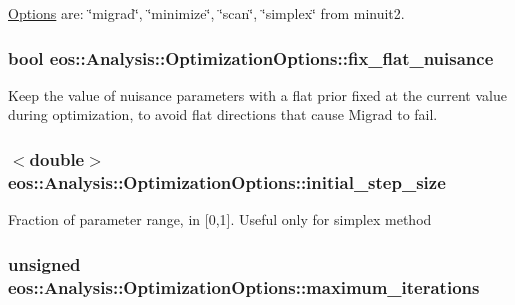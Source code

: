 \hyperlink{classeos_1_1Options}{Options} are: \char`\"{}migrad\char`\"{}, \char`\"{}minimize\char`\"{}, \char`\"{}scan\char`\"{}, \char`\"{}simplex\char`\"{} from minuit2. \hypertarget{structeos_1_1Analysis_1_1OptimizationOptions_abd24b29c8e1953f68dde207d8c5c48df}{
\subsubsection[{fix\_\-flat\_\-nuisance}]{\setlength{\rightskip}{0pt plus 5cm}bool {\bf eos::Analysis::OptimizationOptions::fix\_\-flat\_\-nuisance}}}
\label{structeos_1_1Analysis_1_1OptimizationOptions_abd24b29c8e1953f68dde207d8c5c48df}
Keep the value of nuisance parameters with a flat prior fixed at the current value during optimization, to avoid flat directions that cause Migrad to fail. \hypertarget{structeos_1_1Analysis_1_1OptimizationOptions_a8626041b40a908e5c1443fba86a2586b}{
\subsubsection[{initial\_\-step\_\-size}]{$<$double$>$ {\bf eos::Analysis::OptimizationOptions::initial\_\-step\_\-size}}}
\label{structeos_1_1Analysis_1_1OptimizationOptions_a8626041b40a908e5c1443fba86a2586b}
Fraction of parameter range, in \mbox{[}0,1\mbox{]}. Useful only for simplex method \hypertarget{structeos_1_1Analysis_1_1OptimizationOptions_aa1ec8a9c5e6325a3b090423eb76deda9}{
\subsubsection[{maximum\_\-iterations}]{\setlength{\rightskip}{0pt plus 5cm}unsigned {\bf eos::Analysis::OptimizationOptions::maximum\_\-iterations}}}
